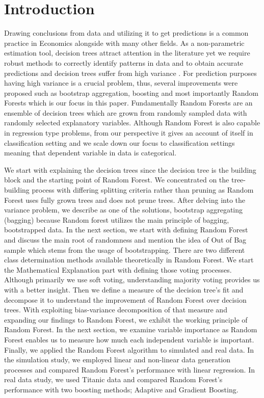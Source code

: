 \section{Introduction}
\label{ch:intro}

Drawing conclusions from data and utilizing it to get predictions is a common practice in Economics alongside with many other fields. 
As a non-parametric estimation tool, decision trees attract attention in the literature 
yet we require robust methods to correctly identify patterns in data and to obtain accurate predictions 
and decision trees suffer from high variance \cite{friedman2001elements}. 
For prediction purposes having high variance is a crucial problem, thus, several improvements were proposed 
such as bootstrap aggregation, boosting and most importantly Random Forests which is our focus in this paper. 
Fundamentally Random Forests are an ensemble of decision trees which are grown from randomly sampled data with 
randomly selected explanatory variables. 
Although Random Forest is also capable in regression type problems, 
from our perspective it gives an account of itself in classification setting and we scale down our focus to classification 
settings meaning that dependent variable in data is categorical. 


We start with explaining the decision trees since the decision tree is the building block and the starting point of Random Forest.
We concentrated on the tree-building process with differing splitting criteria rather than pruning 
as Random Forest uses fully grown trees and does not prune trees. 
After delving into the variance problem, we describe as one of the solutions, bootstrap aggregating (bagging) 
because Random forest utilizes the main principle of bagging, bootstrapped data. 
In the next section, we start with defining Random Forest and discuss the main root of randomness and mention the idea of 
Out of Bag sample which stems from the usage of bootstrapping.
There are two different class determination methods available theoretically in Random Forest. 
We start the Mathematical Explanation part with defining those voting processes. 
Although primarily we use soft voting, understanding majority voting provides us with a better insight.
Then we define a measure of the decision tree's fit and decompose it to understand the improvement of Random Forest over decision trees.
With exploiting bias-variance decomposition of that measure and expanding our findings to Random Forest, 
we exhibit the working principle of Random Forest.
In the next section, we examine variable importance as Random Forest enables us to measure 
how much each independent variable is important.
Finally, we applied the Random Forest algorithm to simulated and real data. 
In the simulation study, we employed linear and non-linear data generation processes and compared Random Forest's performance with linear regression.
In real data study, we used Titanic data \cite{titanicData} and compared Random Forest's performance with two boosting methods; Adaptive and Gradient Boosting.

